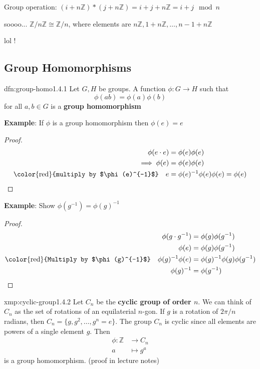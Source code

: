 \documentclass{article}
\begin{document}
Group operation: $(i + n\mathbb{Z}) * (j + n\mathbb{Z}) = i + j + n\mathbb{Z} = i + j \mod n$

soooo... $\mathbb{Z} /n\mathbb{Z} \cong \mathbb{Z} /n$, where elements are $n\mathbb{Z}, 1 + n\mathbb{Z},\dots,n-1 + n\mathbb{Z}$

lol !

\newpage
\subsection{Group Homomorphisms}

\begin{dfn}{dfn:group-homo}{1.4.1}
    Let $G, H$ be groups. A function $\phi : G \to H$ such that
    \[\phi(ab) = \phi(a)\phi(b)\]
    for all $a, b\in G$ is a \textbf{group homomorphism}
\end{dfn}

\textbf{Example}: If $\phi$ is a group homomorphism then $\phi(e) = e$
\begin{proof}
    \begin{align*}
        \phi(e \cdot e) &= \phi(e) \phi(e) \\
        \implies \phi(e) &= \phi(e) \phi(e) \\
        \text{\color{red}{multiply by $\phi(e)^{-1}$}} \quad e &= \phi(e)^{-1}\phi(e)\phi(e) = \phi(e)
    \end{align*}
\end{proof}

\textbf{Example}: Show $\phi(g^{-1}) = \phi(g)^{-1}$
\begin{proof}
    \begin{align*}
        \phi(g \cdot g^{-1}) &= \phi(g)\phi(g^{-1})\\
        \phi(e) &= \phi(g)\phi(g^{-1})\\
        \text{\color{red}{Multiply by $\phi(g)^{-1}$}} \quad \phi(g)^{-1} \phi(e) &= \phi(g)^{-1} \phi(g) \phi(g^{-1}) \\
        \phi(g)^{-1} &= \phi(g^{-1})
    \end{align*}
\end{proof}

\begin{xmp}{xmp:cyclic-group}{1.4.2}
    Let $C_{n}$ be the \textbf{cyclic group of order $n$}. We can think of $C_{n}$ as the set of rotations of an equilaterial $n$-gon. If $g$ is a rotation of $2\pi / n$ radians, then $C_{n} = \{g, g^{2},\dots,g^{n} = e\}$. The group $C_{n}$ is cyclic since all elements are powers of a single element $g$. Then
    \begin{align*}
        \phi : \mathbb{Z} &\to C_{n}\\
        a & \mapsto g^{a}
    \end{align*}
    is a group homomorphism. (proof in lecture notes)
\end{xmp}
\end{document}
